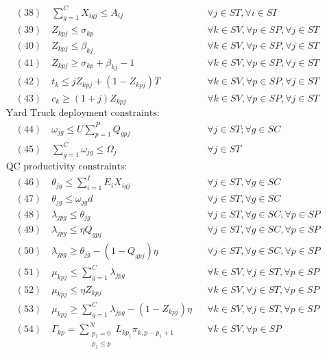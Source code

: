 \documentclass[10pt]{article}
\begin{document}
\begin{align*}
& \quad (38) \quad \sum_{g=1}^{C} X_{igj} \le A_{ij} && \forall j \in ST, \forall i \in SI \\
& \quad (39) \quad Z_{kpj} \le \sigma_{kp} && \forall k \in SV, \forall p \in SP, \forall j \in ST \\
& \quad (40) \quad Z_{kpj} \le \beta_{kj} && \forall k \in SV, \forall p \in SP, \forall j \in ST \\
& \quad (41) \quad Z_{kpj} \ge \sigma_{kp} + \beta_{kj} - 1 && \forall k \in SV, \forall p \in SP, \forall j \in ST \\
& \quad (42) \quad t_k \le j Z_{kpj} + (1 - Z_{kpj}) T && \forall k \in SV, \forall p \in SP, \forall j \in ST \\
& \quad (43) \quad c_k \ge (1 + j) Z_{kpj} && \forall k \in SV, \forall p \in SP, \forall j \in ST \\
& \text{Yard Truck deployment constraints:} \\
& \quad (44) \quad \omega_{jg} \le U \sum_{p=1}^{P} Q_{gpj} && \forall j \in ST; \forall g \in SC \\
& \quad (45) \quad \sum_{g=1}^{C} \omega_{jg} \le \Omega_j && \forall j \in ST \\
& \text{QC productivity constraints:} \\
& \quad (46) \quad \theta_{jg} \le \sum_{i=1}^{I} E_i X_{igj} && \forall j \in ST, \forall g \in SC \\
& \quad (47) \quad \theta_{jg} \le \omega_{jg} d && \forall j \in ST, \forall g \in SC \\
& \quad (48) \quad \lambda_{jpg} \le \theta_{jg} && \forall j \in ST, \forall g \in SC, \forall p \in SP \\
& \quad (49) \quad \lambda_{jpg} \le \eta Q_{gpj} && \forall j \in ST, \forall g \in SC, \forall p \in SP \\
& \quad (50) \quad \lambda_{jpg} \ge \theta_{jg} - (1 - Q_{gpj}) \eta && \forall j \in ST, \forall g \in SC, \forall p \in SP \\
& \quad (51) \quad \mu_{kpj} \le \sum_{g=1}^{C} \lambda_{jpg} && \forall k \in SV, \forall j \in ST, \forall p \in SP \\
& \quad (52) \quad \mu_{kpj} \le \eta Z_{kpj} && \forall k \in SV, \forall j \in ST, \forall p \in SP \\
& \quad (53) \quad \mu_{kpj} \ge \sum_{g=1}^{C} \lambda_{jpg} - (1 - Z_{kpj}) \eta && \forall k \in SV, \forall j \in ST, \forall p \in SP \\
& \quad (54) \quad \Gamma_{kp} = \sum_{\substack{p_1=0 \\ p_1 \le p}}^{N} L_{kp_1} \pi_{k, p-p_1+1} && \forall k \in SV, \forall p \in SP \\

\end{align*}
\end{document}
